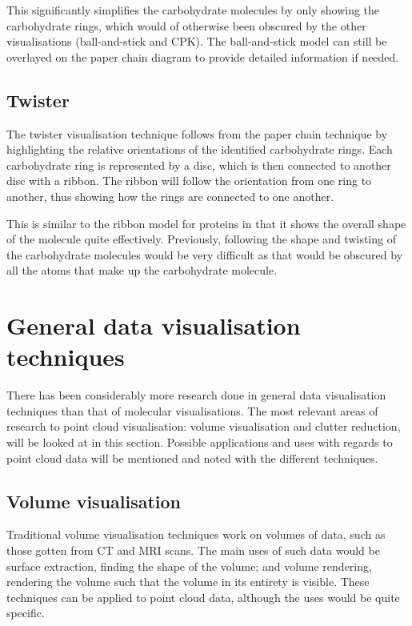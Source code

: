 \documentclass[twocolumn,a4paper]{article}
\begin{document}
This significantly simplifies the carbohydrate molecules by only showing the
carbohydrate rings, which would of otherwise been obscured by the other
visualisations (ball-and-stick and CPK). The ball-and-stick model can still be
overlayed on the paper chain diagram to provide detailed information if needed.

\subsection*{Twister}
The twister visualisation technique \citep{kuttel06} follows from the paper
chain technique by highlighting the relative orientations of the identified
carbohydrate rings. Each carbohydrate ring is represented by a disc, which is
then connected to another disc with a ribbon. The ribbon will follow the
orientation from one ring to another, thus showing how the rings are connected
to one another.

This is similar to the ribbon model for proteins in that it shows the overall
shape of the molecule quite effectively. Previously, following the shape and
twisting of the carbohydrate molecules would be very difficult as that would be
obscured by all the atoms that make up the carbohydrate molecule.


\section{General data visualisation techniques}

There has been considerably more research done in general data visualisation
techniques than that of molecular visualisations. The most relevant areas of
research to point cloud visualisation: volume visualisation and clutter
reduction, will be looked at in this section. Possible applications and uses
with regards to point cloud data will be mentioned and noted with the different
techniques.

\subsection*{Volume visualisation}
Traditional volume visualisation techniques work on volumes of data, such as
those gotten from CT and MRI scans. The main uses of such data would be surface
extraction, finding the shape of the volume; and volume rendering, rendering the
volume such that the volume in its entirety is visible. These techniques can be
applied to point cloud data, although the uses would be quite specific.
\end{document}
